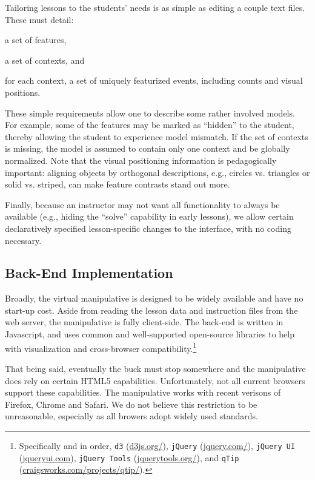 \documentclass[11pt,letterpaper]{article}
\begin{document}
Tailoring lessons to the students' needs is as simple as editing a couple text files. These must detail:
\begin{inparaenum}[(1)]
\item a set of features, 
\item a set of contexts, and
\item for each context, a set of uniquely featurized events, including counts and visual positions.
\end{inparaenum}
These simple requirements allow one to describe some rather involved models. For example, some of 
the features may be marked as ``hidden'' to the student, thereby allowing the student to experience 
model mismatch. If the set of contexts is missing, the model is assumed to contain only 
one context and be globally normalized. Note that the visual positioning information is pedagogically 
important: aligning objects by orthogonal descriptions, e.g., circles vs. triangles or solid vs. striped, 
can make feature contrasts stand out more.

Finally, because an instructor may not want all functionality to always be available (e.g., hiding the ``solve''
capability in early lessons), we allow certain declaratively specified lesson-specific changes to 
the interface, with no coding necessary.

\subsection{Back-End Implementation}
Broadly, the virtual manipulative is designed to be widely available and have no start-up cost. 
Aside from reading the lesson data and instruction files from the web server, the manipulative is fully 
client-side. The back-end is written in Javascript, and uses common and well-supported open-source 
libraries to help with visualization and cross-browser compatibility.\footnote{Specifically and in order, 
\texttt{d3} (\url{d3js.org/}),
\texttt{jQuery} (\url{jquery.com/}), 
\texttt{jQuery UI} (\url{jqueryui.com}),
\texttt{jQuery Tools} (\url{jquerytools.org/}), and
\texttt{qTip} (\url{craigsworks.com/projects/qtip/}).}

That being said, eventually the buck must stop somewhere and the manipulative does rely on certain HTML5 
capabilities. Unfortunately, not all current browsers support these capabilities. The manipulative works 
with recent verisons of Firefox, Chrome and Safari. We do not believe this restriction to be unreasonable, 
especially as all browers adopt widely used standards.
\end{document}
